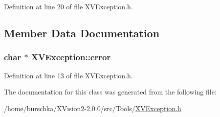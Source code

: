 Definition at line 20 of file XVException.h.

\subsection{Member Data Documentation}
\label{XVException_n0}
\hypertarget{class_XVException_n0}{
\subsubsection[error]{\setlength{\rightskip}{0pt plus 5cm}char $\ast$ XVException::error}}




Definition at line 13 of file XVException.h.

The documentation for this class was generated from the following file:\begin{CompactItemize}
\item 
/home/burschka/XVision2-2.0.0/src/Tools/\hyperlink{XVException.h-source}{XVException.h}\end{CompactItemize}
